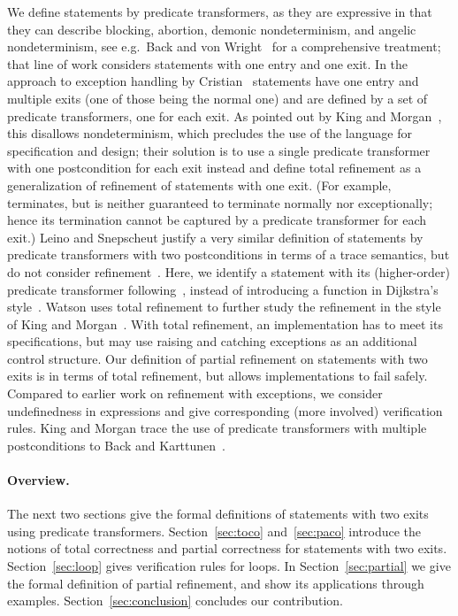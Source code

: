 \documentclass[submission,copyright,creativecommons]{eptcs}
\begin{document}
We define statements by predicate transformers, as they are expressive in that they can describe blocking, abortion, demonic nondeterminism, and angelic nondeterminism, see e.g.~Back and von Wright~\cite{BackVonWright98RefinementCalculus} for a comprehensive treatment; that line of work considers statements with one entry and one exit. In the approach to exception handling by Cristian~\cite{Cristian84CorrectRobustPrograms} statements have one entry and multiple exits (one of those being the normal one) and are defined by a set of predicate transformers, one for each exit. As pointed out by King and Morgan~\cite{KingMorgan95ExitsInRefinementCalculus}, this disallows nondeterminism, which precludes the use of the language for specification and design; their solution is to use a single predicate transformer with one postcondition for each exit instead and define total refinement as a generalization of refinement of statements with one exit. (For example,  terminates, but is neither guaranteed to terminate normally nor exceptionally; hence its termination cannot be captured by a predicate transformer for each exit.) Leino and Snepscheut justify a very similar definition of statements by predicate transformers with two postconditions in terms of a trace semantics, but do not consider refinement~\cite{LeinoSnepscheut94SemanticsExceptions}. Here, we identify a statement  with its (higher-order) predicate transformer following~\cite{BackVonWright98RefinementCalculus}, instead of introducing a function  in Dijkstra's style~\cite{Dijkstra75GuardedCommands}. Watson uses total refinement to further study the refinement in the style of King and Morgan~\cite{Watson02RefiningExceptions}. With total refinement, an implementation has to meet its specifications, but may use raising and catching exceptions as an additional control structure. Our definition of partial refinement on statements with two exits is in terms of total refinement, but allows implementations to fail safely. Compared to earlier work on refinement with exceptions, we consider undefinedness in expressions and give corresponding (more involved) verification rules. King and Morgan trace the use of predicate transformers with multiple postconditions to Back and Karttunen~\cite{BackKarttunen83PredicateTransformerMultipleExits}. 

\paragraph{Overview.} The next two sections give the formal definitions of statements with two exits using predicate transformers. Section~\ref{sec:toco} and~\ref{sec:paco} introduce the notions of total correctness and partial correctness for statements with two exits. Section~\ref{sec:loop} gives verification rules for loops. In Section~\ref{sec:partial} we give the formal definition of partial refinement, and show its applications through examples. Section~\ref{sec:conclusion} concludes our contribution.
\end{document}

